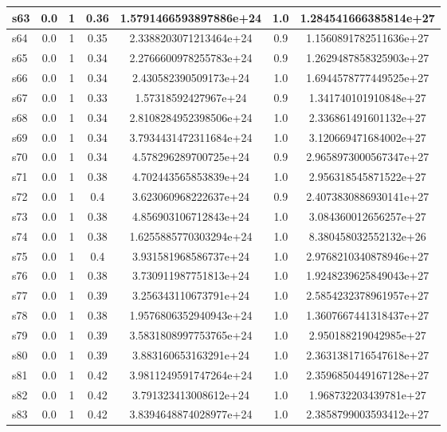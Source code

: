 \documentclass{article}
\begin{document}
\begin{tabular}{|l|c|c|c|c|c|c|}
s63 &0.0 & 1 & 0.36 & 1.5791466593897886e+24 & 1.0 & 1.284541666385814e+27\\
\hline
s64 &0.0 & 1 & 0.35 & 2.3388203071213464e+24 & 0.9 & 1.1560891782511636e+27\\
\hline
s65 &0.0 & 1 & 0.34 & 2.2766600978255783e+24 & 0.9 & 1.2629487858325903e+27\\
\hline
s66 &0.0 & 1 & 0.34 & 2.430582390509173e+24 & 1.0 & 1.6944578777449525e+27\\
\hline
s67 &0.0 & 1 & 0.33 & 1.57318592427967e+24 & 0.9 & 1.341740101910848e+27\\
\hline
s68 &0.0 & 1 & 0.34 & 2.8108284952398506e+24 & 1.0 & 2.336861491601132e+27\\
\hline
s69 &0.0 & 1 & 0.34 & 3.7934431472311684e+24 & 1.0 & 3.120669471684002e+27\\
\hline
s70 &0.0 & 1 & 0.34 & 4.578296289700725e+24 & 0.9 & 2.9658973000567347e+27\\
\hline
s71 &0.0 & 1 & 0.38 & 4.702443565853839e+24 & 1.0 & 2.956318545871522e+27\\
\hline
s72 &0.0 & 1 & 0.4 & 3.623060968222637e+24 & 0.9 & 2.4073830886930141e+27\\
\hline
s73 &0.0 & 1 & 0.38 & 4.856903106712843e+24 & 1.0 & 3.084360012656257e+27\\
\hline
s74 &0.0 & 1 & 0.38 & 1.6255885770303294e+24 & 1.0 & 8.380458032552132e+26\\
\hline
s75 &0.0 & 1 & 0.4 & 3.931581968586737e+24 & 1.0 & 2.9768210340878946e+27\\
\hline
s76 &0.0 & 1 & 0.38 & 3.730911987751813e+24 & 1.0 & 1.9248239625849043e+27\\
\hline
s77 &0.0 & 1 & 0.39 & 3.256343110673791e+24 & 1.0 & 2.5854232378961957e+27\\
\hline
s78 &0.0 & 1 & 0.38 & 1.9576806352940943e+24 & 1.0 & 1.3607667441318437e+27\\
\hline
s79 &0.0 & 1 & 0.39 & 3.5831808997753765e+24 & 1.0 & 2.950188219042985e+27\\
\hline
s80 &0.0 & 1 & 0.39 & 3.883160653163291e+24 & 1.0 & 2.3631381716547618e+27\\
\hline
s81 &0.0 & 1 & 0.42 & 3.9811249591747264e+24 & 1.0 & 2.3596850449167128e+27\\
\hline
s82 &0.0 & 1 & 0.42 & 3.791323413008612e+24 & 1.0 & 1.968732203439781e+27\\
\hline
s83 &0.0 & 1 & 0.42 & 3.8394648874028977e+24 & 1.0 & 2.3858799003593412e+27\\
\hline

\end{tabular}
\end{document}
